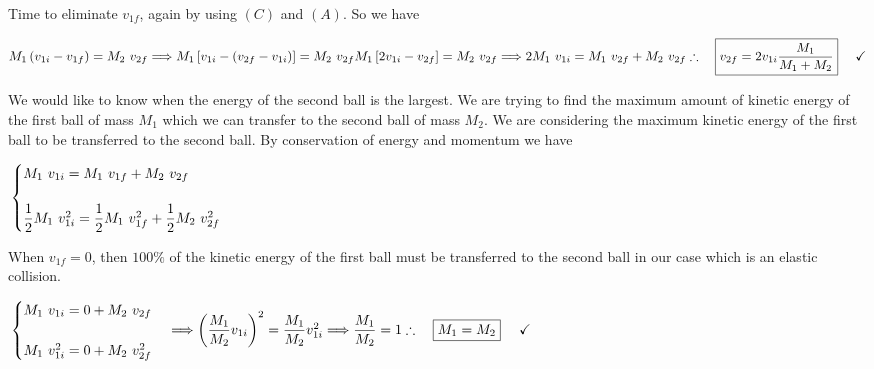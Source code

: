 \documentclass[fleqn]{article}
\begin{document}
Time to eliminate $v_{1f}$, again by using $(C)$ and $(A)$. So we have

$
  \\
  M_1\left(v_{1i}-v_{1f}\right)=M_2 ~ v_{2f} 
  \Longrightarrow  M_1 \left[v_{1i}-\left(v_{2f}-v_{1i}\right)\right]=M_2 ~ v_{2f}
  \\
  \\
  M_1 \left[2v_{1i}-v_{2f}\right]=M_2 ~ v_{2f} \Longrightarrow 2 M_1 ~ v_{1i}=M_1 ~ v_{2f}+M_2 ~ v_{2f}
  \\
  \\
  \\
  \therefore ~~~ \boxed{v_{2f}=2 v_{1i} \dfrac{M_1}{M_1+M_2}} ~~~~ \checkmark
  \\
  \\
$

\pagebreak

We would like to know when the energy of the second ball is the largest. We are trying to find the maximum amount 
of kinetic energy of the first ball of mass $M_1$ which we can transfer to the second ball of mass $M_2$. We are considering 
the maximum kinetic energy of the first ball to be transferred to the second ball. By conservation of energy and momentum we have

$
  \\
  \begin{cases}
    M_1 ~ v_{1i}=M_1 ~ v_{1f}+M_2 ~ v_{2f}  
    \\
    \\
    \dfrac{1}{2} M_1 ~ v_{1i}^2=\dfrac{1}{2} M_1 ~ v_{1f}^2+\dfrac{1}{2} M_2 ~ v_{2f}^2  
  \end{cases}
  \\
  \\
$

When $v_{1f}=0$, then $100\%$ of the kinetic energy of the first ball must be transferred to the second ball in our case 
which is an elastic collision.

$
  \\
  \begin{cases}
    M_1 ~ v_{1i}=0+M_2 ~ v_{2f}  
    \\
    \\
    M_1 ~ v_{1i}^2=0+M_2 ~ v_{2f}^2  
  \end{cases} 
  \Longrightarrow 
  \left(\dfrac{M_1}{M_2} v_{1i} \right)^2=\dfrac{M_1}{M_2} v_{1i}^2
  \Longrightarrow \dfrac{M_1}{M_2}=1
  \\
  \\
  \\
  \therefore ~~~ \boxed{M_1=M_2} ~~~~ \checkmark
  \\
$
\end{document}

